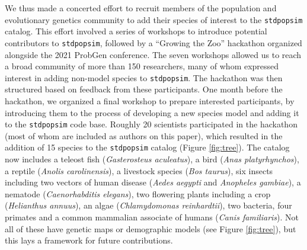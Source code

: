 \documentclass[hidelinks]{article}
\newcommand{\stdpopsim}{\texttt{stdpopsim}\xspace}
\begin{document}
We thus made a concerted effort
to recruit members of the population and evolutionary genetics community
to add their species of interest to the \stdpopsim catalog.
This effort involved a series of workshops to introduce potential contributors to \stdpopsim, followed by a ``Growing the Zoo'' hackathon organized alongside the 2021 ProbGen conference.
The seven workshops allowed us to reach a broad community of more than 150 researchers,
many of whom expressed interest in adding non-model species to \stdpopsim.
The hackathon was then structured based on feedback from these participants.
One month before the hackathon, we organized a final workshop to prepare interested
participants, by introducing them to  the process of developing
a new species model and adding it to the \stdpopsim code base.
Roughly 20 scientists participated in the hackathon (most of whom are included as authors on this paper),
which resulted in the addition of 15 species to the \stdpopsim catalog
(Figure \ref{fig:tree}).
The catalog now includes
a teleost fish (\textit{Gasterosteus aculeatus}),
a bird (\textit{Anas platyrhynchos}),
a reptile (\textit{Anolis carolinensis}),
a livestock species (\textit{Bos taurus}),
six insects including two vectors of human disease (\textit{Aedes aegypti} and \textit{Anopheles gambiae}),
a nematode (\textit{Caenorhabditis elegans}),
two flowering plants including a crop (\textit{Helianthus annuus}),
an algae (\textit{Chlamydomonas reinhardtii}),
two bacteria,
four primates and a common mammalian associate of humans (\textit{Canis familiaris}).
Not all of these have genetic maps or demographic models (see Figure \ref{fig:tree}),
but this lays a framework for future contributions.
\end{document}
